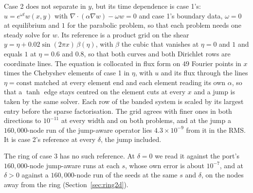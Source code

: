 \documentclass[11pt]{amsart}
\theoremstyle{definition}
\theoremstyle{remark}
\newcommand{\sci}[2]{#1 \times 10^{#2}}
\begin{document}
Case 2 does not separate in $y$, but its time dependence is case 1's:
$u = e^{\omega t} w(x, y)$ with $\nabla \cdot (\alpha \nabla w) - \omega w = 0$
and case 1's boundary data, $\omega = 0$ at equilibrium and $1$ for the
parabolic problem, so that each problem needs one steady solve for $w$. Its
reference is a product grid on the shear
$y = \eta + 0.02 \sin (2\pi x)\, \beta(\eta)$, with $\beta$ the cubic that
vanishes at $\eta = 0$ and $1$ and equals $1$ at $\eta = 0.6$ and $0.8$, so
that both curves and both Dirichlet rows are coordinate lines. The equation
is collocated in flux form on $49$ Fourier points in $x$ times the Chebyshev
elements of case 1 in $\eta$, with $u$ and its flux through the lines
$\eta = \text{const}$ matched at every element end and each element reading
its own $\alpha$, so that a $\tanh$ edge stays centred on the element cuts at
every $x$ and a jump is taken by the same solver. Each row of the banded
system is scaled by its largest entry before the sparse factorisation. The
grid agrees with finer ones in both directions to $10^{-11}$ at every width
and on both problems, and at the jump a $160{,}000$-node run of the
jump-aware operator lies $\sci{4.3}{-9}$ from it in the RMS. It is case 2's
reference at every $\delta$, the jump included.

The ring of case 3 has no such reference. At $\delta = 0$ we read it against
the port's $160{,}000$-node jump-aware runs at each $s$, whose own error is
about $10^{-7}$, and at $\delta > 0$ against a $160{,}000$-node run of the
seeds at the same $s$ and $\delta$, on the nodes away from the ring
(Section~\ref{sec:ring2d}).

\begin{table}
  \centering
  \caption{The references' own accuracy: the largest difference from a finer
  reference, on case 1 in $y$ at $4001$ points for both problems ($\omega = 0$ and
  $\omega = 1$), on case 2 in $x$ and in $\eta$ at $4000$ points of the strip (the
  larger over the two problems). The fourth column is the distance
  $\sup |v_\delta - v_0|$ of case 1's profile from the jump's, and at
  $\delta = 0$ from the analytic solution. Last line: the RMS difference, at
  its nodes, between case 2's grid at $\delta = 0$ and a $160{,}000$-node
  jump-aware solution.}
  \label{tab:references2d}
  \footnotesize
  
\end{table}
\end{document}

